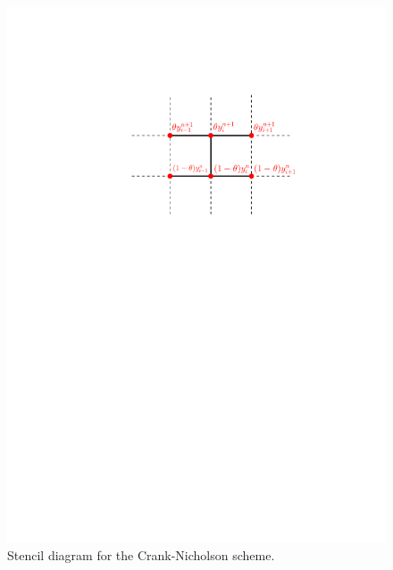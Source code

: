 \begin{figure}[H]
  \label{fig:lcp:thetamethod:stencil}
  \centering
  \includegraphics[scale=0.75]{chapters/chapter5/CrankNicholsonStencil.pdf}
  \caption{Stencil diagram for the Crank-Nicholson scheme.}
\end{figure}

